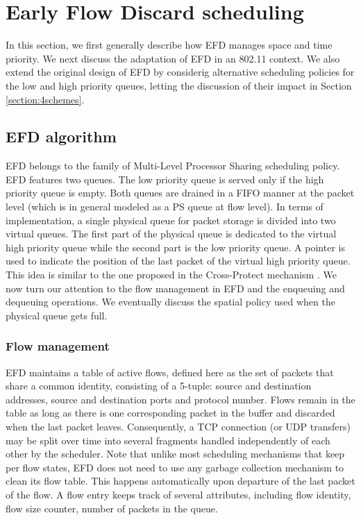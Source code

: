 \documentclass[preprint,12pt]{elsarticle}
\begin{document}
\section{Early Flow Discard scheduling}
\label{sec:efd_alg}

In this section, we first generally describe how EFD manages space and time priority. We next discuss the adaptation of EFD in an 802.11 context. We also extend the original design of EFD by considerig alternative scheduling policies for the low and high priority queues, letting the discussion of their impact in Section \ref{section:4schemes}. 

\subsection{EFD algorithm}
EFD belongs to the family of Multi-Level Processor Sharing scheduling policy. EFD features two queues. The low priority queue is served only if the high priority queue is empty. Both queues are drained in a FIFO manner at the packet level (which is in general modeled as a PS queue at flow level). In terms of implementation, a single physical queue for packet storage is divided into two virtual queues. The first part of the physical queue is dedicated to the virtual high priority queue while the second part is the low priority queue. A pointer is used to indicate the position of the last packet of the virtual high priority queue. This idea is similar to the one proposed in the Cross-Protect mechanism \cite{Kortebi04Xprotect}. We now turn our attention to the flow management in EFD and the enqueuing and dequeuing operations. We eventually discuss the spatial policy used when the physical queue gets full.

\subsubsection{Flow management}
EFD maintains a table of active flows, defined here as the set of packets that share a common identity, consisting of a 5-tuple: source and destination addresses, source and destination ports and protocol number. Flows remain in the table as long as there is one corresponding packet in the buffer and discarded when the last packet leaves. Consequently, a TCP connection (or UDP transfers) may be split over time into several fragments handled independently of each other by the scheduler. Note that unlike most scheduling mechanisms that keep per flow states, EFD does not need to use any garbage collection mechanism to clean its flow table. This happens automatically upon departure of the last packet of the flow. A flow entry keeps track of several attributes, including flow identity, flow size counter, number of packets in the queue. %
\end{document}
